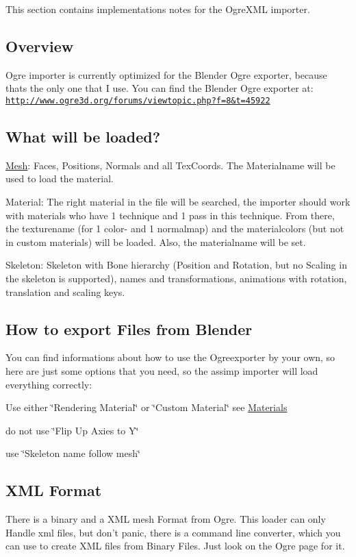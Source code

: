 This section contains implementations notes for the Ogre\+X\+M\+L importer. \hypertarget{importer_notes_overview}{}\subsection{Overview}\label{importer_notes_overview}
Ogre importer is currently optimized for the Blender Ogre exporter, because thats the only one that I use. You can find the Blender Ogre exporter at\+: \href{http://www.ogre3d.org/forums/viewtopic.php?f=8&t=45922}{\tt http\+://www.\+ogre3d.\+org/forums/viewtopic.\+php?f=8\&t=45922}\hypertarget{importer_notes_what}{}\subsection{What will be loaded?}\label{importer_notes_what}
\hyperlink{class_mesh}{Mesh}\+: Faces, Positions, Normals and all Tex\+Coords. The Materialname will be used to load the material.

Material\+: The right material in the file will be searched, the importer should work with materials who have 1 technique and 1 pass in this technique. From there, the texturename (for 1 color-\/ and 1 normalmap) and the materialcolors (but not in custom materials) will be loaded. Also, the materialname will be set.

Skeleton\+: Skeleton with Bone hierarchy (Position and Rotation, but no Scaling in the skeleton is supported), names and transformations, animations with rotation, translation and scaling keys.\hypertarget{importer_notes_export_Blender}{}\subsection{How to export Files from Blender}\label{importer_notes_export_Blender}
You can find informations about how to use the Ogreexporter by your own, so here are just some options that you need, so the assimp importer will load everything correctly\+:
\begin{DoxyItemize}
\item Use either \char`\"{}\+Rendering Material\char`\"{} or \char`\"{}\+Custom Material\char`\"{} see \hyperlink{importer_notes_material}{Materials}
\item do not use \char`\"{}\+Flip Up Axies to Y\char`\"{}
\item use \char`\"{}\+Skeleton name follow mesh\char`\"{}
\end{DoxyItemize}\hypertarget{importer_notes_xml}{}\subsection{X\+M\+L Format}\label{importer_notes_xml}
There is a binary and a X\+M\+L mesh Format from Ogre. This loader can only Handle xml files, but don't panic, there is a command line converter, which you can use to create X\+M\+L files from Binary Files. Just look on the Ogre page for it.

